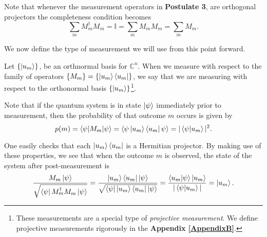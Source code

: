 Note that whenever the measurement operators in \textbf{Postulate 3}, are orthogonal projectors the completeness condition becomes
\begin{equation}
\sum\limits_m M_m^\dagger M_m = \mathbb{I} = \sum\limits_m M_m M_m = \sum\limits_m M_m.
\end{equation}


We now define the type of measurement we will use from this point forward.  

\begin{definition} \label{def: measurement in a basis state vector}
Let $\{\ket{u_m}\}$, be an orthnormal basis for $\mathbb{C}^n$.  When we measure with respect to the family of operators $\{M_m\}=\{\ket{u_m}\bra{u_m}\}$, we say that we are measuring with respect to the orthonormal basis $\{\ket{u_m}\}$\footnote{These measurements are a special type of \textit{projective measurement}.  We define projective measurements rigorously in the \textbf{Appendix \ref{AppendixB}}.}.
\end{definition}
Note that if the quantum system is in state $\ket{\psi}$ immediately prior to measurement, then the probability of that outcome $m$ occurs is given by
\begin{equation}\label{eqn: basis measurement probability}
    p(m)=\braket{\psi|M_m|\psi}=\braket{\psi\ket{u_m}\bra{u_m}\psi}   =|\braket{\psi|u_m}|^2.
\end{equation}

One easily checks that each $\ket{u_m}\bra{u_m}$ is a Hermitian projector.  By making use of these properties, we see that when the outcome $m$ is observed, the state of the system after post-measurement is
\begin{equation} 
\frac{M_m \ket{\psi}}{\sqrt{\bra{\psi}M_m^\dagger M_m \ket{\psi}}}=\frac{\ket{u_m}\bra{u_m} \ket{\psi}}{\sqrt{\bra{\psi}\ket{u_m}\bra{u_m} \ket{\psi}}}=\frac{\braket{u_m|\psi}\ket{u_m}}{|\braket{\psi|u_m}|}=\ket{u_m}.
\end{equation}



